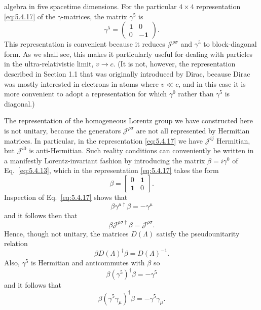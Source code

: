 algebra in five spacetime dimensions. For the particular $4\times4$
representation \eqref{eq:5.4.17} of the $\gamma$-matrices, the matrix $\gamma^5$ is
\begin{equation}
\gamma^5=\begin{pmatrix}\mathbf{1}&0\\0&-\mathbf{1}\end{pmatrix}.
\tag{5.4.28}\label{eq:5.4.28}
\end{equation}
This representation is convenient because it reduces $\mathcal{J}^{\rho\sigma}$
and $\gamma^5$ to block-diagonal form. As we shall see, this makes it
particularly useful for dealing with particles in the ultra-relativistic
limit, $v\to c$. (It is not, however, the representation described in Section
1.1 that was originally introduced by Dirac, because Dirac was mostly
interested in electrons in atoms where $v\ll c$, and in this case it is more
convenient to adopt a representation for which $\gamma^0$ rather than
$\gamma^5$ is diagonal.)

The representation of the homogeneous Lorentz group we have constructed here
is not unitary, because the generators $\mathcal{J}^{\rho\sigma}$ are not all
represented by Hermitian matrices. In particular, in the representation
\eqref{eq:5.4.17} we have $\mathcal{J}^{ij}$ Hermitian, but $\mathcal{J}^{i0}$ is
anti-Hermitian. Such reality conditions can conveniently be written in a
manifestly Lorentz-invariant fashion by introducing the matrix
$\beta=i\gamma^0$ of Eq.~\eqref{eq:5.4.13}, which in the representation \eqref{eq:5.4.17} takes
the form
\begin{equation}
\beta=\begin{bmatrix}0&\mathbf{1}\\\mathbf{1}&0\end{bmatrix}.
\tag{5.4.29}\label{eq:5.4.29}
\end{equation}
Inspection of Eq.~\eqref{eq:5.4.17} shows that
\begin{equation}
\beta\gamma^{\mu\dagger}\beta=-\gamma^\mu
\tag{5.4.30}\label{eq:5.4.30}
\end{equation}
and it follows then that
\begin{equation}
\beta\mathcal{J}^{\rho\sigma\dagger}\beta=\mathcal{J}^{\rho\sigma}.
\tag{5.4.31}\label{eq:5.4.31}
\end{equation}
Hence, though not unitary, the matrices $D(\Lambda)$ satisfy the
pseudounitarity relation
\begin{equation}
\beta D(\Lambda)^\dagger\beta=D(\Lambda)^{-1}.
\tag{5.4.32}\label{eq:5.4.32}
\end{equation}
Also, $\gamma^5$ is Hermitian and anticommutes with $\beta$ so
\begin{equation}
\beta(\gamma^5)^\dagger\beta=-\gamma^5
\tag{5.4.33}\label{eq:5.4.33}
\end{equation}
and it follows that
\begin{equation}
\beta(\gamma^5\gamma_\mu)^\dagger\beta=-\gamma^5\gamma_\mu.
\tag{5.4.34}\label{eq:5.4.34}
\end{equation}

